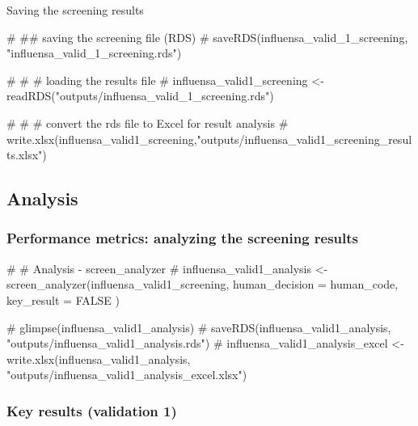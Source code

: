 \documentclass[
  letterpaper,
  DIV=11,
  numbers=noendperiod]{scrartcl}
\newenvironment{Shaded}{\begin{snugshade}}{\end{snugshade}}
\newcommand{\CommentTok}[1]{\textcolor[rgb]{0.37,0.37,0.37}{#1}}
\begin{document}
Saving the screening results

\begin{Shaded}
\begin{Highlighting}[]
\CommentTok{\# \#\# saving the screening file (RDS)}
\CommentTok{\# saveRDS(influensa\_valid\_1\_screening, "influensa\_valid\_1\_screening.rds")}

\CommentTok{\# \# \# loading the results file}
\CommentTok{\# influensa\_valid1\_screening \textless{}{-} readRDS("outputs/influensa\_valid\_1\_screening.rds")}

\CommentTok{\# \# \# convert the rds file to Excel for result analysis}
\CommentTok{\# write.xlsx(influensa\_valid1\_screening,"outputs/influensa\_valid1\_screening\_results.xlsx")}
\end{Highlighting}
\end{Shaded}

\subsection{Analysis}\label{analysis}

\subsubsection{Performance metrics: analyzing the screening
results}\label{performance-metrics-analyzing-the-screening-results}

\begin{Shaded}
\begin{Highlighting}[]
\CommentTok{\# \#  Analysis {-} screen\_analyzer }
\CommentTok{\# influensa\_valid1\_analysis \textless{}{-} screen\_analyzer(influensa\_valid1\_screening, human\_decision = human\_code, key\_result = FALSE ) }

\CommentTok{\# glimpse(influensa\_valid1\_analysis)}
\CommentTok{\# saveRDS(influensa\_valid1\_analysis, "outputs/influensa\_valid1\_analysis.rds") }
\CommentTok{\# influensa\_valid1\_analysis\_excel \textless{}{-} write.xlsx(influensa\_valid1\_analysis, "outputs/influensa\_valid1\_analysis\_excel.xlsx")}
\end{Highlighting}
\end{Shaded}

\subsubsection{Key results (validation
1)}\label{key-results-validation-1}
\end{document}
